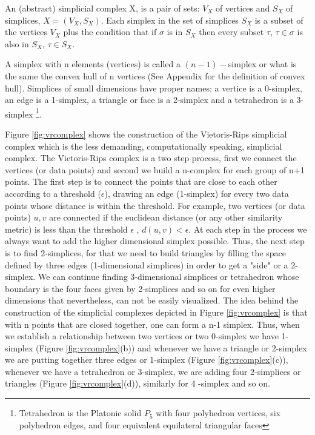 \documentclass[onecollarge,runningheads]{svjour2}
\begin{document}
\begin{definition}
An (abstract) simplicial complex X, is a pair of sets: $V_X$ of vertices and $S_X$ of simplices, $X=(V_X,S_X)$. Each simplex in the set of simplices $S_X$ is a subset of the vertices $V_X$ plus the condition that if $\sigma$ is in $S_X$ then every subset $\tau$, $\tau \in \sigma$ is also in $S_X$, $\tau \in S_X$.
\end{definition}

A simplex with n elements (vertices) is called a $(n-1)-$simplex or what is the same the convex hull of n vertices (See Appendix for the definition of convex hull). Simplices of small dimensions have proper names: a vertice is a 0-simplex, an edge is a 1-simplex, a triangle or face is a 2-simplex and a tetrahedron is a 3-simplex \footnote{Tetrahedron is the Platonic solid $P_5$ with four polyhedron vertices, six polyhedron edges, and four equivalent equilateral triangular faces}.

Figure \ref{fig:vrcomplex} shows the construction of the Vietoris-Rips simplicial complex \cite{hausmann1995vietoris} which is the less demanding, computationally speaking, simplicial complex. The Vietoris-Rips complex is a two step process, first we connect the vertices (or data points) and second we build a n-complex for each group of n+1 points. The first step is to connect the points that are close to each other according to a threshold ($\epsilon$), drawing an edge (1-simplex) for every two data points whose distance is within the threshold. For example, two vertices (or data points) $u,v$ are connected if the euclidean distance (or any other similarity metric) is less than the threshold $\epsilon$ , $d(u,v) < \epsilon$. At each step in the process we always want to add the higher dimensional simplex possible. Thus, the next step is to find 2-simplices, for that we need to build triangles by filling the space defined by three edges (1-dimensional simplices) in order to get a "side" or a 2-simplex. We can continue finding 3-dimensional simplices or tetrahedron whose boundary is the four faces given by 2-simplices and so on for even higher dimensions that nevertheless, can not be easily visualized. The idea behind the construction of the simplicial complexes depicted in Figure \ref{fig:vrcomplex} is that with n points that are closed together, one can form a n-1 simplex. Thus, when we establish a relationship between two vertices or two 0-simplex we have 1-simplex (Figure \ref{fig:vrcomplex}(b)) and whenever we have a triangle or 2-simplex we are putting together three edges or 1-simplex (Figure \ref{fig:vrcomplex}(c)), whenever we have a tetrahedron or 3-simplex, we are adding four 2-simplices or triangles (Figure \ref{fig:vrcomplex}(d)), similarly for 4 -simplex and so on.
\end{document}
